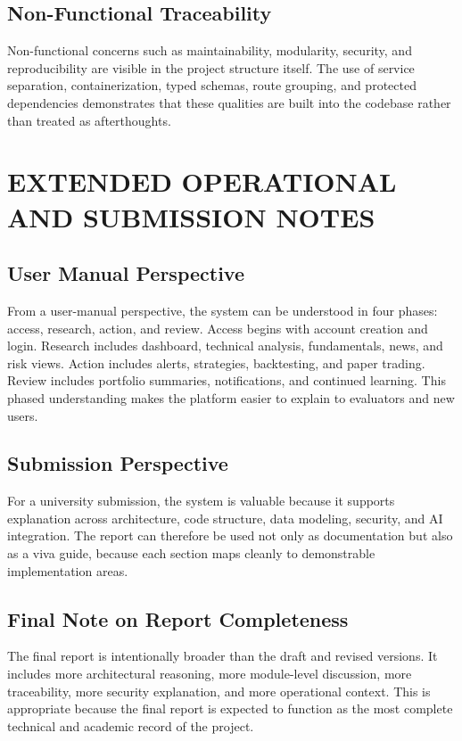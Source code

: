 \documentclass[12pt,a4paper]{report}
\begin{document}
\section{Non-Functional Traceability}
Non-functional concerns such as maintainability, modularity, security, and reproducibility are visible in the project structure itself. The use of service separation, containerization, typed schemas, route grouping, and protected dependencies demonstrates that these qualities are built into the codebase rather than treated as afterthoughts.

\chapter{EXTENDED OPERATIONAL AND SUBMISSION NOTES}
\section{User Manual Perspective}
From a user-manual perspective, the system can be understood in four phases: access, research, action, and review. Access begins with account creation and login. Research includes dashboard, technical analysis, fundamentals, news, and risk views. Action includes alerts, strategies, backtesting, and paper trading. Review includes portfolio summaries, notifications, and continued learning. This phased understanding makes the platform easier to explain to evaluators and new users.

\section{Submission Perspective}
For a university submission, the system is valuable because it supports explanation across architecture, code structure, data modeling, security, and AI integration. The report can therefore be used not only as documentation but also as a viva guide, because each section maps cleanly to demonstrable implementation areas.

\section{Final Note on Report Completeness}
The final report is intentionally broader than the draft and revised versions. It includes more architectural reasoning, more module-level discussion, more traceability, more security explanation, and more operational context. This is appropriate because the final report is expected to function as the most complete technical and academic record of the project.
\end{document}
